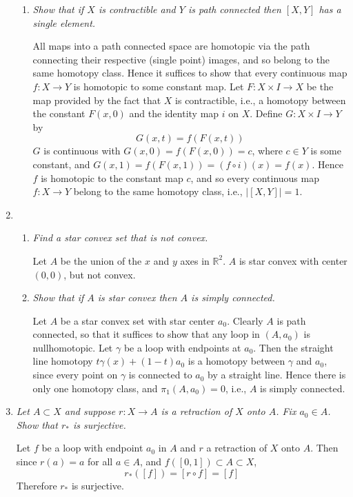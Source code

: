 \documentclass[10pt]{article}
\newcommand{\R}{\mathbb{R}}
\begin{document}
\begin{enumerate}
\begin{enumerate}
\item \emph{Show that if $X$ is contractible and $Y$ is path connected then $[X,Y]$ has a single element.}

All maps into a path connected space are homotopic via the path connecting their respective (single point) images, and so belong to the same homotopy class.  Hence it suffices to show that every continuous map $f: X \rightarrow Y$ is homotopic to some constant map.  Let $F: X \times I \rightarrow X$ be the map provided by the fact that $X$ is contractible, i.e., a homotopy between the constant $F(x,0)$ and the identity map $i$ on $X$.  Define $G: X \times I \rightarrow Y$ by $$G(x,t) = f(F(x,t))$$  $G$ is continuous with $G(x,0) = f(F(x,0)) = c$, where $c \in Y$ is some constant, and $G(x,1) = f(F(x,1)) = (f \circ i)(x) = f(x)$.  Hence $f$ is homotopic to the constant map $c$, and so every continuous map $f: X \rightarrow Y$ belong to the same homotopy class, i.e., $\left|[X,Y]\right| = 1$.

\end{enumerate}

\item
\begin{enumerate}
\item \emph{Find a star convex set that is not convex.}

Let $A$ be the union of the $x$ and $y$ axes in $\R^2$.  $A$ is star convex with center $(0,0)$, but not convex.

\item \emph{Show that if $A$ is star convex then $A$ is simply connected.}

Let $A$ be a star convex set with star center $a_0$.  Clearly $A$ is path connected, so that it suffices to show that any loop in $(A,a_0)$ is nullhomotopic.  Let $\gamma$ be a loop with endpoints at $a_0$.  Then the straight line homotopy $t\gamma(x) + (1-t)a_0$ is a homotopy between $\gamma$ and $a_0$, since every point on $\gamma$ is connected to $a_0$ by a straight line.  Hence there is only one homotopy class, and $\pi_1(A,a_0) = 0$, i.e., $A$ is simply connected.

\end{enumerate}

\item \emph{Let $A \subset X$ and suppose $r: X \rightarrow A$ is a retraction of $X$ onto $A$.  Fix $a_0 \in A$.  Show that $r_\ast$ is surjective.}

Let $f$ be a loop with endpoint $a_0$ in $A$ and $r$ a retraction of $X$ onto $A$.  Then since $r(a) = a$ for all $a \in A$, and $f([0,1]) \subset A \subset X$, $$r_\ast([f]) = [r \circ f] = [f]$$ Therefore $r_\ast$ is surjective.


\end{enumerate}
\end{document}
